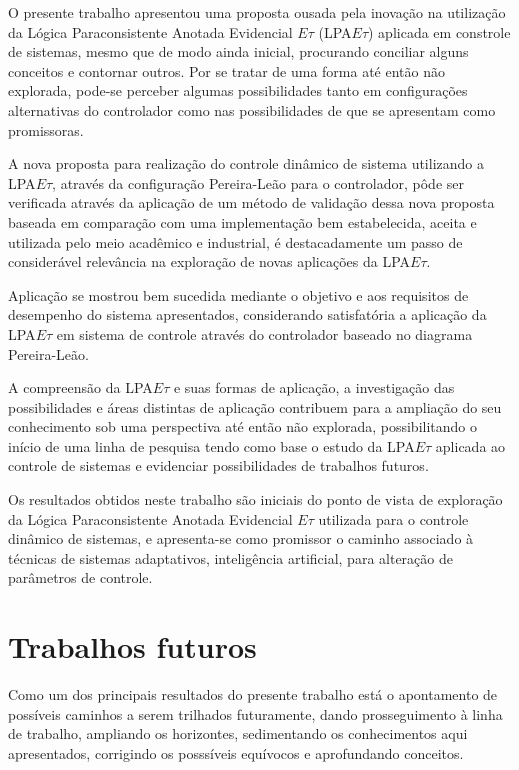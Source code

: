 O presente trabalho apresentou uma
proposta ousada pela inovação na utilização da
Lógica Paraconsistente Anotada Evidencial $E\tau$
(LPA$E\tau$) aplicada em constrole de sistemas,
mesmo que de modo ainda inicial,
procurando conciliar
alguns conceitos e contornar outros.
Por se tratar de uma forma
até então não explorada,
pode-se perceber algumas possibilidades
tanto em configurações alternativas do
controlador como nas possibilidades de
que se apresentam como promissoras.

A nova proposta para realização do
controle dinâmico de sistema utilizando a
LPA$E\tau$,
através da configuração Pereira-Leão
para o controlador,
pôde ser verificada através da
aplicação de um método de validação
dessa nova proposta baseada em
comparação com uma implementação bem estabelecida,
aceita e utilizada pelo meio
acadêmico e industrial,
é destacadamente um passo de
considerável relevância na exploração de
novas aplicações da LPA$E\tau$.

Aplicação se mostrou bem sucedida mediante o objetivo e aos requisitos de desempenho do sistema apresentados, considerando satisfatória a aplicação da LPA$E\tau$ em sistema de controle através do controlador baseado no diagrama Pereira-Leão.

A compreensão da LPA$E\tau$ e
suas formas de aplicação,
a investigação das possibilidades e
áreas distintas de aplicação
contribuem para a ampliação do
seu conhecimento sob uma perspectiva
até então não explorada,
possibilitando o início de
uma linha de pesquisa
tendo como base o estudo da LPA$E\tau$
aplicada ao controle de sistemas e
evidenciar possibilidades de trabalhos futuros.



Os resultados obtidos neste trabalho são iniciais do ponto de vista de exploração da Lógica Paraconsistente Anotada Evidencial $E\tau$ utilizada para o controle dinâmico de sistemas, e apresenta-se como promissor o caminho associado à técnicas de sistemas adaptativos, inteligência artificial, para alteração de parâmetros de controle.


\section{Trabalhos futuros}

Como um dos principais resultados do presente trabalho está o apontamento de possíveis caminhos a serem trilhados futuramente, dando prosseguimento à linha de trabalho, ampliando os horizontes, sedimentando os conhecimentos aqui apresentados, corrigindo os posssíveis equívocos e aprofundando conceitos.

